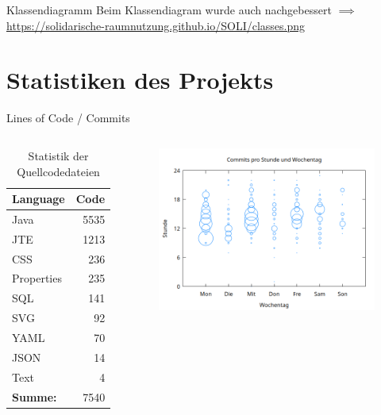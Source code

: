 \documentclass{sdqbeamer}
\begin{document}
    \begin{frame}{Klassendiagramm}
        Beim Klassendiagram wurde auch nachgebessert
        \hfill \break
        \hfill \break
        $\implies$ \url{https://solidarische-raumnutzung.github.io/SOLI/classes.png}
    \end{frame}
    
    \section{Statistiken des Projekts}
    
    \begin{frame}{Lines of Code / Commits}
        \thispagestyle{plain}
        \begin{columns}
             \begin{table}[h]
        \centering
        \begin{tabular}{lr}
            \toprule
            Language & Code \\
            \midrule
            Java        & 5535 \\
            JTE        & 1213 \\
            CSS         & 236  \\
            Properties  & 235  \\
            SQL        & 141  \\
            SVG        & 92   \\
            YAML       & 70   \\
            JSON       & 14   \\
            Text       & 4    \\
            \midrule
            \textbf{Summe:} & 7540 \\
            \bottomrule
        \end{tabular}
        \caption{Statistik der Quellcodedateien}
        \label{tab:code_stats}
    \end{table}
        \begin{figure}
            \centering
            \includegraphics[width=1\linewidth]{hours.png}

\end{figure}
\end{columns}
\end{frame}
\end{document}
